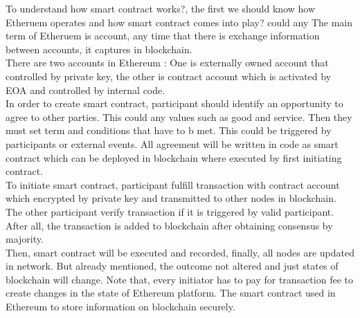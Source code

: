 To understand how smart contract works?, the first we should know how Etheruem operates and how smart contract comes into play?
could any The main term of Etheruem is account, any time that there is exchange information between accounts, it captures in blockchain.\\
There are two accounts in Ethereum : One is externally owned account that controlled by private key, the other is contract account which is activated by EOA and controlled by internal code.\\
In order to create smart contract, participant should identify an opportunity to agree to other parties. This could any values such as good and service. Then they must set term and conditions that have to b met. This could be triggered by participants or external events. All agreement will be written in code as smart contract which can be deployed in blockchain where executed by first initiating contract.\\
To initiate smart contract, participant fulfill transaction with contract account which encrypted by private key and transmitted to other nodes in blockchain. The other participant verify transaction if it is triggered by valid participant. After all, the transaction is added to blockchain after obtaining consensus by majority.\\
Then, smart contract will be executed and recorded, finally, all nodes are updated in network. But already mentioned, the outcome not altered and just states of blockchain will change. Note that, every initiator has to pay for transaction fee to create changes in the state of Ethereum platform. The smart contract used in Ethereum to store information on blockchain securely\cite{Angwei}.\\

